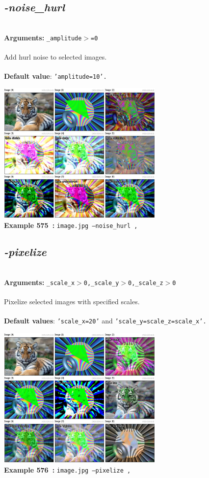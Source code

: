 \documentclass[a4paper,11pt,twoside]{book}
\begin{document}
\subsection{\emph{-noise\_hurl} }\vspace*{-0.5em}
~\\\textbf{Arguments: } 
{\small \texttt{\_amplitude$>$=0}}\\~\\
Add hurl noise to selected images.
~\\~\\\textbf{Default value}: {\small \texttt{'amplitude=10'.}}
\begin{center}\includegraphics[keepaspectratio=true,height=7cm,width=\textwidth]{img/gmic_def575.jpg}\\
{\footnotesize \textbf{Example 575~:} \texttt{image.jpg --noise\_hurl ,}}
\end{center}

\subsection{\emph{-pixelize} }\vspace*{-0.5em}
~\\\textbf{Arguments: } 
{\small \texttt{\_scale\_x$>$0,\_scale\_y$>$0,\_scale\_z$>$0}}\\~\\
Pixelize selected images with specified scales.
~\\~\\\textbf{Default values}: {\small \texttt{'scale\_x=20'} and \texttt{'scale\_y=scale\_z=scale\_x'.}}
\begin{center}\includegraphics[keepaspectratio=true,height=7cm,width=\textwidth]{img/gmic_def576.jpg}\\
{\footnotesize \textbf{Example 576~:} \texttt{image.jpg --pixelize ,}}
\end{center}
\end{document}
